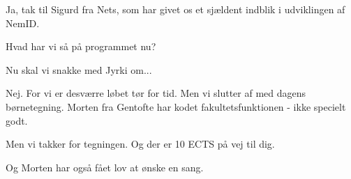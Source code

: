 \documentclass[a4paper,11pt]{article}
\begin{document}
\begin{sketch}

 Ja, tak til Sigurd fra Nets, som har givet os et sjældent indblik i
udviklingen af NemID.

 Hvad har vi så på programmet nu?

 Nu skal vi snakke med Jyrki om...

 Nej.  For vi er desværre løbet tør for tid.  Men vi slutter af med dagens børnetegning. Morten fra Gentofte har kodet fakultetsfunktionen - ikke
specielt godt.


 Men vi takker for tegningen. Og der er 10 ECTS på vej til dig.

 Og Morten har også fået lov at ønske en sang.

\end{sketch}
\end{document}
